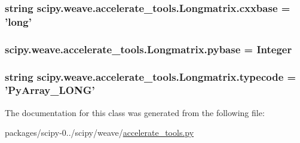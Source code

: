 \subsubsection[{cxxbase}]{\setlength{\rightskip}{0pt plus 5cm}string scipy.\+weave.\+accelerate\+\_\+tools.\+Longmatrix.\+cxxbase = 'long'\hspace{0.3cm}{\ttfamily [static]}}\label{classscipy_1_1weave_1_1accelerate__tools_1_1Longmatrix_a00139706be6d12c0123e88614ab136c1}
\hypertarget{classscipy_1_1weave_1_1accelerate__tools_1_1Longmatrix_a67747613f2473603959d8ff935610c19}{}
\subsubsection[{pybase}]{\setlength{\rightskip}{0pt plus 5cm}scipy.\+weave.\+accelerate\+\_\+tools.\+Longmatrix.\+pybase = {\bf Integer}\hspace{0.3cm}{\ttfamily [static]}}\label{classscipy_1_1weave_1_1accelerate__tools_1_1Longmatrix_a67747613f2473603959d8ff935610c19}
\hypertarget{classscipy_1_1weave_1_1accelerate__tools_1_1Longmatrix_a5aa7f4b424733aba5c2f38df60a19efd}{}
\subsubsection[{typecode}]{\setlength{\rightskip}{0pt plus 5cm}string scipy.\+weave.\+accelerate\+\_\+tools.\+Longmatrix.\+typecode = 'Py\+Array\+\_\+\+L\+O\+N\+G'\hspace{0.3cm}{\ttfamily [static]}}\label{classscipy_1_1weave_1_1accelerate__tools_1_1Longmatrix_a5aa7f4b424733aba5c2f38df60a19efd}


The documentation for this class was generated from the following file\+:\begin{DoxyCompactItemize}
\item 
packages/scipy-\/0../scipy/weave/\hyperlink{accelerate__tools_8py}{accelerate\+\_\+tools.\+py}\end{DoxyCompactItemize}
